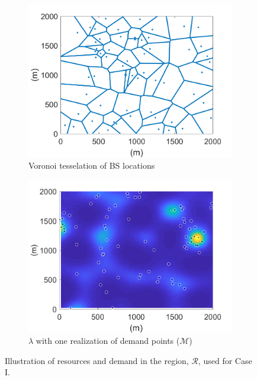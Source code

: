 \documentclass[12pt,dvipsnames]{report}
\begin{document}
\begin{figure}[htp]
	\centering
	\begin{subfigure}{.49\textwidth}
		\centering
		\includegraphics[width=1\linewidth]{Figures/Prelim_BSLocationsVoronoi}
		\caption{\small Voronoi tesselation of BS locations}
		\label{fig:CaseI_BSLocVor}
	\end{subfigure} \hfill
	\begin{subfigure}{.49\textwidth}
		\centering
		\includegraphics[width=1\linewidth]{Figures/Prelim_SSLTnsPPP_demandpointreal}
		\caption{\small $\lambda$ with one realization of demand points ($\mathcal{M}$)}
		\label{fig:CaseI_SSLTDPReal}
	\end{subfigure}
	\caption[Illustration of resources and demand used for Case I]{Illustration of resources and demand in the region, $\mathcal{R}$, used for Case I.}
	\label{fig:CaseI_NetworkArea}
\end{figure}
\end{document}
